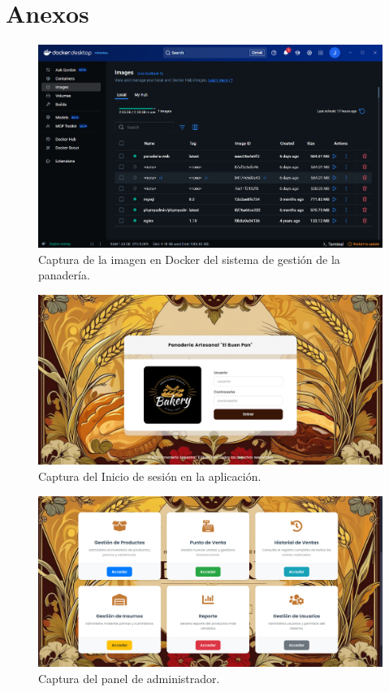 \documentclass[conference]{IEEEtran}
\begin{document}
\section{Anexos}

\begin{figure}[htbp]
\centerline{\includegraphics[width=\columnwidth]{images/docker.png}}
\caption{Captura de la imagen en Docker del sistema de gestión de la panadería.}
\label{fig:clases}
\end{figure}

\begin{figure}[htbp]
\centerline{\includegraphics[width=\columnwidth]{images/login.png}}
\caption{Captura del Inicio de sesión en la aplicación.}
\label{fig:clases}
\end{figure}

\begin{figure}[htbp]
\centerline{\includegraphics[width=\columnwidth]{images/control_admin.png}}
\caption{Captura del panel de administrador.}
\label{fig:clases}
\end{figure}
\end{document}
